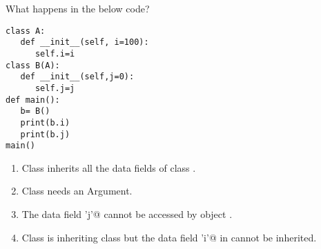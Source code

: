 \question
What happens in the below code?

\begin{lstlisting}
class A: 
   def __init__(self, i=100): 
      self.i=i 
class B(A): 
   def __init__(self,j=0): 
      self.j=j 
def main(): 
   b= B() 
   print(b.i) 
   print(b.j) 
main() 
\end{lstlisting}

\begin{enumerate}
\item Class \lstinline@B@ inherits all the data fields of class \lstinline@A@.
\item Class \lstinline@B@ needs an Argument.
\item The data field \lstinline@'j'@ cannot be accessed by object \lstinline@b@.
\item Class \lstinline@B@ is inheriting class \lstinline@A@ but the data field \lstinline@'i'@ in \lstinline@A@ cannot be inherited.
\end{enumerate}


